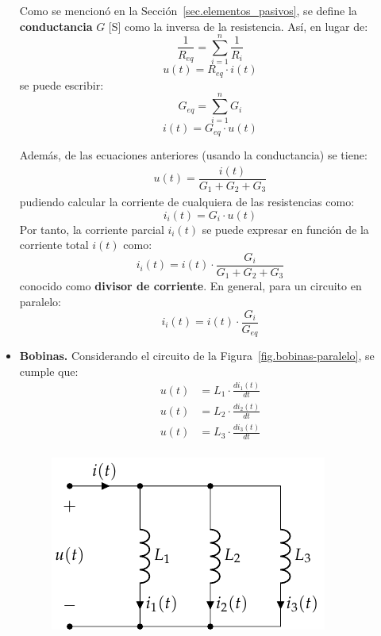 \documentclass[11pt]{book} %
\numberwithin{dummy}{section}
\theoremstyle{ocrenumbox}
\theoremstyle{blacknumex}
\theoremstyle{blacknumbox}
\theoremstyle{ocrenum}
\begin{document}
\begin{itemize}
		Como se mencionó en la Sección~\ref{sec.elementos_pasivos}, se define la \textbf{conductancia} $G$ [S] como la inversa de la resistencia. Así, en lugar de:
		\begin{equation*}
			\dfrac{1}{R_{eq}} = \sum_{i = 1}^n \dfrac{1}{R_i}
		\end{equation*}
		\begin{equation*}
			u(t) = R_{eq} \cdot i(t)
		\end{equation*}
		se puede escribir:
		\begin{equation}
			\boxed{G_{eq} = \sum_{i = 1}^n G_i}
		\end{equation}
		\begin{equation*}
			i(t) = G_{eq} \cdot u(t)
		\end{equation*}
		
		Además, de las ecuaciones anteriores (usando la conductancia) se tiene:
		\begin{align*}
			u(t) = \dfrac{i(t)}{G_1 + G_2 + G_3}
		\end{align*}
		pudiendo calcular la corriente de cualquiera de las resistencias como: 
		\begin{equation*}
			i_i(t) = G_i \cdot u(t)
		\end{equation*}
		Por tanto, la corriente parcial $i_i(t)$ se puede expresar en función de la corriente total $i(t)$ como: 
		\begin{equation*}
			i_i(t) = i(t) \cdot \dfrac{G_i}{G_1 + G_2 + G_3}
		\end{equation*}
		conocido como \textbf{divisor de corriente}. En general, para un circuito en paralelo:
		\begin{equation}
			\boxed{i_i(t) = i(t) \cdot \frac{G_i}{G_{eq}}}
		\end{equation}
		\item \textbf{Bobinas.} Considerando el circuito de la Figura~\ref{fig.bobinas-paralelo}, se cumple que:
		\begin{align*}
			u(t) &= L_1 \cdot \frac{di_1(t)}{dt}\\
			u(t) &= L_2 \cdot \frac{di_2(t)}{dt}\\
			u(t) &= L_3 \cdot \frac{di_3(t)}{dt}\\
		\end{align*}
		\begin{figure}[htbp]
			\centering
			\includegraphics[width=0.35\linewidth]{../figs/BobinasParalelo.pdf}

\end{figure}
\end{itemize}
\end{document}
